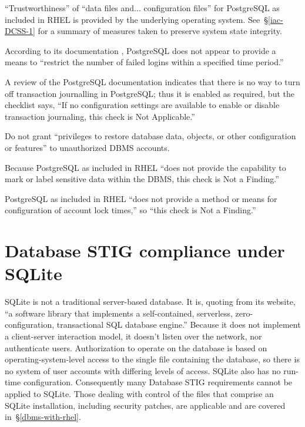 %
``Trustworthiness'' of ``data files and... configuration files'' for
PostgreSQL as included in RHEL is provided by the underlying operating
system. See~\S\ref{iac-DCSS-1} for a summary of measures taken to preserve
system state integrity.

%
According to its documentation \cite{pgsql-documentation}, PostgreSQL does
not appear to provide a means to ``restrict the number of failed logins
within a specified time period.''

%
A review of the PostgreSQL documentation \cite{pgsql-documentation}
indicates that there is no way to turn off transaction journalling in
PostgreSQL; thus it is enabled as required, but the checklist says, ``If
no configuration settings are available to enable or disable transaction
journaling, this check is Not Applicable.''

%
Do not grant ``privileges to restore database data, objects, or other
configuration or features'' to unauthorized DBMS accounts. 

%
Because PostgreSQL as included in RHEL ``does not provide the capability
to mark or label sensitive data within the DBMS, this check is Not a
Finding.''

%
PostgreSQL as included in RHEL ``does not provide a method or means for
configuration of account lock times,'' so ``this check is Not a Finding.''








\section{Database STIG compliance under SQLite}
\label{DatabaseSTIGSQLite}

SQLite is not a traditional server-based database. It is, quoting from its
website, ``a software library that implements a self-contained,
serverless, zero-configuration, transactional SQL database engine.''
Because it does not implement a client-server interaction model, it
doesn't listen over the network, nor authenticate users. Authorization to
operate on the database is based on operating-system-level access to the
single file containing the database, so there is no system of user
accounts with differing levels of access. SQLite also has no run-time
configuration. Consequently many Database STIG requirements cannot be
applied to SQLite. Those dealing with control of the files that comprise
an SQLite installation, including security patches, are applicable and are
covered in~\S\ref{dbms-with-rhel}.

